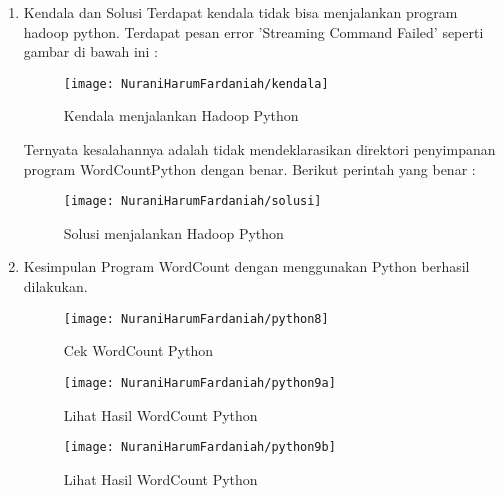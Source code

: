 \begin{enumerate}
\item Kendala dan Solusi
\newline Terdapat kendala tidak bisa menjalankan program hadoop python. Terdapat pesan error 'Streaming Command Failed' seperti gambar di bawah ini :

\begin{figure}[!ht]
\texttt{[image: NuraniHarumFardaniah/kendala]}
\caption{Kendala menjalankan Hadoop Python}
\label{gam:perkuliahan-25-11}
\end{figure}

Ternyata kesalahannya adalah tidak mendeklarasikan direktori penyimpanan program WordCountPython dengan benar. Berikut perintah yang benar :

\begin{figure}[!ht]
\texttt{[image: NuraniHarumFardaniah/solusi]}
\caption{Solusi menjalankan Hadoop Python}
\label{gam:perkuliahan-25-11}
\end{figure}

\item Kesimpulan
\newline Program WordCount dengan menggunakan Python berhasil dilakukan.

\begin{figure}[!ht]
\texttt{[image: NuraniHarumFardaniah/python8]}
\caption{Cek WordCount Python}
\label{gam:perkuliahan-25-11}
\end{figure}

\begin{figure}[!ht]
\texttt{[image: NuraniHarumFardaniah/python9a]}
\caption{Lihat Hasil WordCount Python}
\label{gam:perkuliahan-25-11}
\end{figure}

\begin{figure}[!ht]
\texttt{[image: NuraniHarumFardaniah/python9b]}
\caption{Lihat Hasil WordCount Python}
\label{gam:perkuliahan-25-11}
\end{figure}

\end{enumerate}